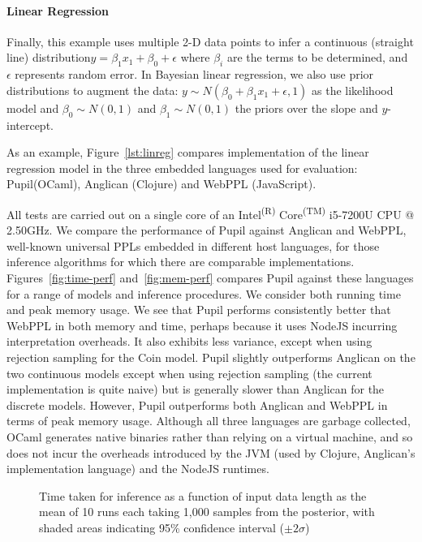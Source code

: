 \documentclass[sigconf,timestamp]{acmart}
\newcommand{\pupil}{Pupil\xspace}
\begin{document}
\paragraph{Linear Regression}
Finally, this example uses multiple 2-D data points to infer a continuous (straight line) distribution$ y=\beta_1 x_1 + \beta_0 + \epsilon$ where  $\beta_i$ are the terms to be determined, and $\epsilon$ represents random error. In Bayesian linear regression, we also use prior distributions to augment the data:   $y \sim N(\beta_0 + \beta_1 x_1 + \epsilon, 1)$ as the likelihood model and $\beta_0 \sim N(0,1)$ and $\beta_1 \sim N(0,1)$ the priors over the slope and $y$-intercept.

As an example, Figure~\ref{lst:linreg} compares implementation of the linear regression model in the three embedded languages used for evaluation: \pupil (OCaml), Anglican (Clojure) and WebPPL (JavaScript).

All tests are carried out on a single core of an Intel\textsuperscript{(R)} Core\textsuperscript{(TM)} i5-7200U CPU @ 2.50GHz. We compare the performance of \pupil against Anglican and WebPPL, well-known universal PPLs embedded in different host languages, for those inference algorithms for which there are comparable implementations. Figures~\ref{fig:time-perf} and~\ref{fig:mem-perf} compares \pupil against these languages for a range of models and inference procedures. We consider both running time and peak memory usage. We see that \pupil performs consistently better that WebPPL in both memory and time, perhaps because it uses NodeJS incurring interpretation overheads. It also exhibits less variance, except when using rejection sampling for the Coin model. \pupil slightly outperforms Anglican on the two continuous models except when using rejection sampling (the current implementation is quite naive) but is generally slower than Anglican for the discrete models. However, \pupil outperforms both Anglican and WebPPL in terms of peak memory usage. Although all three languages are garbage collected, OCaml generates native binaries rather than relying on a virtual machine, and so does not incur the overheads introduced by the JVM (used by Clojure, Anglican's implementation language) and the NodeJS runtimes.

\begin{figure}
  \centering
  
  \caption{\label{fig:time-datasize}
    Time taken for inference as a function of input data length as the mean of 10 runs each taking 1,000 samples from the posterior, with shaded areas indicating 95\% confidence interval ($\pm 2\sigma$)}
\end{figure}
\end{document}
